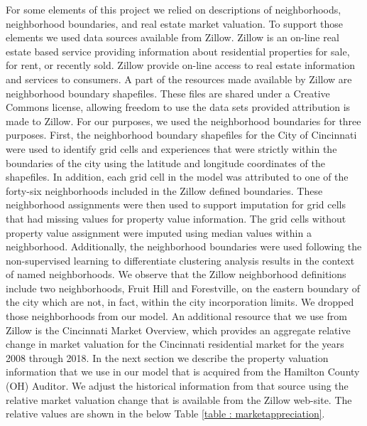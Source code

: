 \documentclass{llncs}
\begin{document}
For some elements of this project we relied on descriptions of neighborhoods, neighborhood boundaries, and real estate market valuation. To support those elements we used data sources available from Zillow. Zillow is an on-line real estate based service providing information about residential properties for sale, for rent, or recently sold. Zillow provide on-line access to real estate information and services to consumers. A part of the resources made available by Zillow are neighborhood boundary shapefiles. These files are shared under a Creative Commons license, allowing freedom to use the data sets provided attribution is made to Zillow. For our purposes, we used the neighborhood boundaries for three purposes. First, the neighborhood boundary shapefiles for the City of Cincinnati were used to identify grid cells and experiences that were strictly within the boundaries of the city using the latitude and longitude coordinates of the shapefiles. In addition, each grid cell in the model was attributed to one of the forty-six neighborhoods included in the Zillow defined boundaries. These neighborhood assignments were then used to support imputation for grid cells that had missing values for property value information. The grid cells without property value assignment were imputed using median values within a neighborhood. Additionally, the neighborhood boundaries were used following the non-supervised learning to differentiate clustering analysis results in the context of named neighborhoods. We observe that the Zillow neighborhood definitions include two neighborhoods, Fruit Hill and Forestville, on the eastern boundary of the city which are not, in fact, within the city incorporation limits. We dropped those neighborhoods from our model. An additional resource that we use from Zillow is the Cincinnati Market Overview, which provides an aggregate relative change in market valuation for the Cincinnati residential market for the years 2008 through 2018.  In the next section we describe the property valuation information that we use in our model that is acquired from the Hamilton County (OH) Auditor. We adjust the historical information from that source using the relative market valuation change that is available from the Zillow web-site. The relative values are shown in the below Table \ref{table : marketappreciation}.
\end{document}
